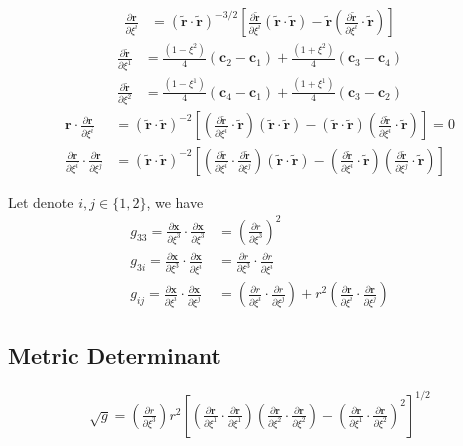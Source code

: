 \documentclass{report}
\newcommand{\vb}{\mathbf}
\newcommand{\tilder}{\widetilde{\vb{r}}}
\newcommand{\pdiff}[2]{\frac{\partial #1}{\partial #2}}
\begin{document}
\begin{align}
\pdiff{\vb{r}}{\xi^i} &= (\tilder \cdot \tilder)^{-3/2} \left[ \pdiff{\tilder}{\xi^i} (\tilder \cdot \tilder) - \tilder \left( \pdiff{\tilder}{\xi^i} \cdot \tilder \right) \right]
\end{align}
\begin{align}
\pdiff{\tilder}{\xi^1} &= \frac{(1-\xi^2)}{4} (\vb{c}_2 - \vb{c}_1) + \frac{(1 + \xi^2)}{4} (\vb{c}_3 - \vb{c}_4) \\
\pdiff{\tilder}{\xi^2} &= \frac{(1-\xi^1)}{4} (\vb{c}_4 - \vb{c}_1) + \frac{(1 + \xi^1)}{4} (\vb{c}_3 - \vb{c}_2)
\end{align}
\begin{align}
\vb{r} \cdot \pdiff{\vb{r}}{\xi^i} &= (\tilder \cdot \tilder)^{-2} \left[ \left( \pdiff{\tilder}{\xi^i} \cdot \tilder \right) (\tilder \cdot \tilder) - (\tilder \cdot \tilder) \left( \pdiff{\tilder}{\xi^i} \cdot \tilder \right) \right] = 0 \\
\pdiff{\vb{r}}{\xi^i} \cdot \pdiff{\vb{r}}{\xi^j} &= (\tilder \cdot \tilder)^{-2} \left[ \left( \pdiff{\tilder}{\xi^i} \cdot \pdiff{\tilder}{\xi^j} \right) (\tilder \cdot \tilder) - \left( \pdiff{\tilder}{\xi^i} \cdot \tilder \right) \left( \pdiff{\tilder}{\xi^j} \cdot \tilder \right) \right]
\end{align}


Let denote $i,j \in \{1,2\}$, we have
\begin{align}
\label{eq:g-sphere}
g_{33} = \pdiff{\vb{x}}{\xi^3} \cdot \pdiff{\vb{x}}{\xi^3} &= \left( \pdiff{r}{\xi^3} \right)^2 \\
g_{3 i} = \pdiff{\vb{x}}{\xi^3} \cdot \pdiff{\vb{x}}{\xi^i} &= \pdiff{r}{\xi^3} \cdot \pdiff{r}{\xi^i} \\
g_{ij} = \pdiff{\vb{x}}{\xi^i} \cdot \pdiff{\vb{x}}{\xi^j} &= \left( \pdiff{r}{\xi^i} \cdot \pdiff{r}{\xi^j} \right) + r^2 \left( \pdiff{\vb{r}}{\xi^i} \cdot \pdiff{\vb{r}}{\xi^j} \right)
\end{align}

\subsection{Metric Determinant}

\begin{align}
\sqrt{g} = \left( \pdiff{r}{\xi^3} \right) r^2 \left[ \left( \pdiff{\vb{r}}{\xi^1} \cdot \pdiff{\vb{r}}{\xi^1} \right) \left( \pdiff{\vb{r}}{\xi^2} \cdot \pdiff{\vb{r}}{\xi^2} \right) - \left( \pdiff{\vb{r}}{\xi^1} \cdot \pdiff{\vb{r}}{\xi^2} \right)^2 \right]^{1/2}
\end{align}
\end{document}
